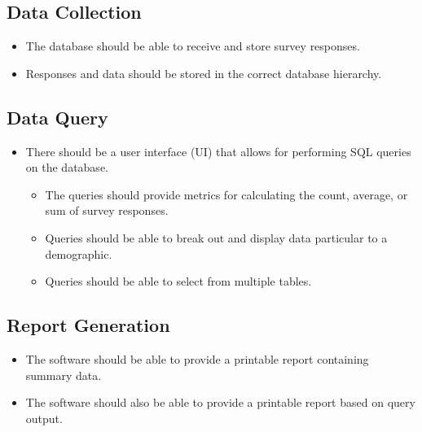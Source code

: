 \documentclass[letterpaper,10pt,titlepag,e draftclsnofoot,onecolumn]{IEEEtran}
\begin{document}
\subsection{Data Collection}
\begin{itemize}
\item The database should be able to receive and store survey responses.
\item Responses and data should be stored in the correct database hierarchy.
\end{itemize}

\subsection{Data Query}
\begin{itemize}
\item There should be a user interface (UI) that allows for performing SQL queries on the database.
	\begin{itemize}
	\item The queries should provide metrics for calculating the count, average, or sum of survey responses.
	\item Queries should be able to break out and display data particular to a demographic.
	\item Queries should be able to select from multiple tables.
	\end{itemize}
\end{itemize}

\subsection{Report Generation}
\begin{itemize}
\item The software should be able to provide a printable report containing summary data.
\item The software should also be able to provide a printable report based on query output.
\end{itemize}
\end{document}
